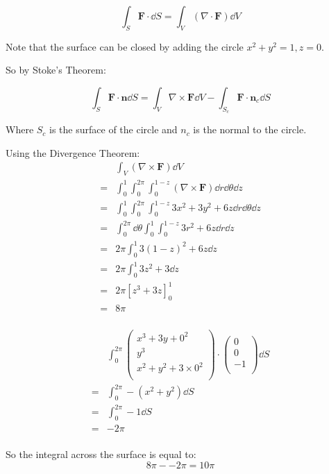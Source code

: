 \documentclass[10pt,\jkfside,a4paper]{article}
\begin{document}
\begin{enumerate}
\[
\int_S \mathbf{F} \cdot \dd{S} = \int_V (\nabla \cdot \mathbf{F}) \dd{V}
\]

Note that the surface can be closed by adding the circle $x^2 + y^2 = 1, z = 0$.

So by Stoke's Theorem:

\[
\int_S \mathbf{F}\cdot \mathbf{n} \dd{S} = \int_V \nabla \times \mathbf{F} \dd{V} - \int_{S_c} \mathbf{F} \cdot \mathbf{n}_c \dd{S}
\]

Where $S_c$ is the surface of the circle and $n_c$ is the normal to the circle.

Using the Divergence Theorem:
\[
\begin{split}
 & \int_V (\nabla \times \mathbf{F}) \dd{V} \\
=& \int^1_0\int^{2\pi}_0\int^{1-z}_{0} (\nabla \times \mathbf{F}) \dd{r}\dd{\theta}\dd{z} \\
=& \int^1_0\int^{2\pi}_0\int^{1-z}_{0} 3x^2 + 3y^2 + 6z \dd{r}\dd{\theta}\dd{z} \\
=& \int^{2\pi}_0\dd{\theta}\int^1_0\int^{1-z}_{0} 3r^2 + 6z \dd{r}\dd{z} \\
=& 2\pi\int^1_0 3(1-z)^2 + 6z \dd{z} \\
=& 2\pi\int^1_0 3z^2 + 3 \dd{z} \\
=& 2\pi\left[z^3 + 3z\right]^1_0 \\
=& 8\pi \\
\end{split}
\]

\[
\begin{split}
 & \int^{2\pi}_0 \begin{pmatrix} x^3 + 3y + 0^2 \\ y^3 \\ x^2 + y^2 + 3\times 0^2 \\ \end{pmatrix} \cdot \begin{pmatrix} 0 \\ 0 \\ -1 \\ \end{pmatrix} \dd{S} \\
=& \int^{2\pi}_0 -(x^2 + y^2) \dd{S} \\
=& \int^{2\pi}_0 -1 \dd{S} \\
=& -2\pi \\
\end{split}
\]

So the integral across the surface is equal to:
\[
8\pi - -2\pi = 10\pi
\]


\end{enumerate}
\end{document}
